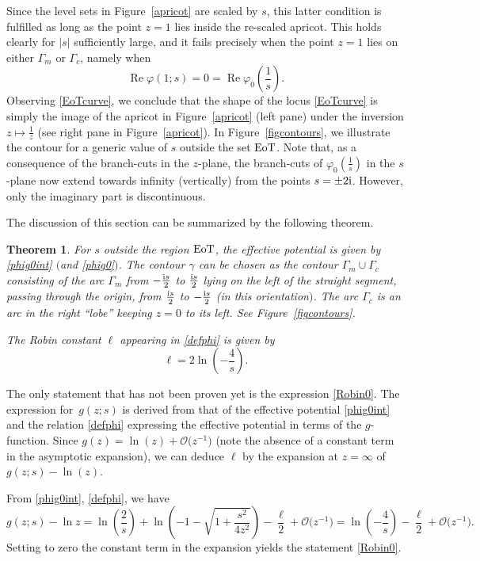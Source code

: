 \documentclass[10pt,a4paper]{amsart}
\numberwithin{equation}{section}
\newtheorem{Theorem}{Theorem}[section]
\theoremstyle{definition}
\def\le{\left}
\def\ri{\right}
\def\be{\begin{equation}}
\def\ee{\end{equation}}
\def \Re{\operatorname{Re} }
\begin{document}
 Since the level sets in Figure~\ref{apricot} are scaled by $s$, this latter condition is fulfilled as long as the point $z=1$ lies inside the re-scaled apricot. This holds clearly for $|s|$ sufficiently large, and it fails precisely when the point $z=1$ lies on either $\Gamma_m$ or $\Gamma_c$, namely when
 \be
 \label{EoTcurve}
 \Re \varphi(1;s) = 0 = \Re \varphi_0\le(\frac 1 s\ri).
 \ee
 Observing \eqref{EoTcurve}, we conclude that the shape of the locus \eqref{EoTcurve} is simply the image of the apricot in Figure~\ref{apricot} (left pane) under the inversion $z\mapsto \frac 1 z$ (see right pane in Figure~\ref{apricot}).
In Figure~\ref{figcontours},
 we illustrate the contour for a generic value of $s$ outside the set ${\rm EoT}$.
 Note that, as a consequence of the branch-cuts in the $z$-plane, the branch-cuts of $\varphi_0\le(\frac 1 s\ri)$ in the $s$-plane now extend towards infinity (vertically) from the points $s = \pm 2{\rm i}$. However, only the imaginary part is discontinuous.

The discussion of this section can be summarized by the following theorem.
\begin{Theorem}
For $s$ outside the region ${\rm EoT}$, the effective potential is given by \eqref{phig0int} $($and \eqref{phig0}$)$. The contour $\gamma$ can be chosen as the contour $\Gamma_m\cup \Gamma_c$ consisting of the arc $\Gamma_{m}$ from $-\frac {{\rm i}s} 2$ to $\frac {{\rm i}s} 2$ lying on the left of the straight segment, passing through the origin, from $\frac {{\rm i}s}2$ to $-\frac {{\rm i}s}2$ {\rm(}in this orientation$)$. The arc $\Gamma_{c}$ is an arc in the right ``lobe'' keeping $z=0$ to its left. See Figure~{\rm\ref{figcontours}}.

The Robin constant $\ell$ appearing in \eqref{defphi} is given by
\be
\label{Robin0}
\ell = 2 \ln \le(-\frac 4 s\ri).
\ee
\end{Theorem}
The only statement that has not been proven yet is the expression \eqref{Robin0}. The expression for~$g(z;s)$ is derived from that of the effective potential \eqref{phig0int} and the relation \eqref{defphi} expressing the effective potential in terms of the $g$-function.
Since $g(z) = \ln (z) + \mathcal O\bigl(z^{-1}\bigr)$ (note the absence of a constant term in the asymptotic expansion),
we can deduce $\ell$ by the expansion at $z=\infty$ of~${g(z;s)- \ln(z)}$.

From \eqref{phig0int}, \eqref{defphi}, we have
\[
g(z;s)-\ln z = \ln \le(\frac 2 s\ri) + \ln \le(-1 - \sqrt{1 + \frac{s^2}{4z^2}}\ri) - \frac \ell 2 + \mathcal O\bigl(z^{-1}\bigr) = \ln\le(-\frac 4 s\ri) - \frac \ell 2 + \mathcal O\bigl(z^{-1}\bigr).
\]
Setting to zero the constant term in the expansion yields the statement \eqref{Robin0}.
\end{document}
